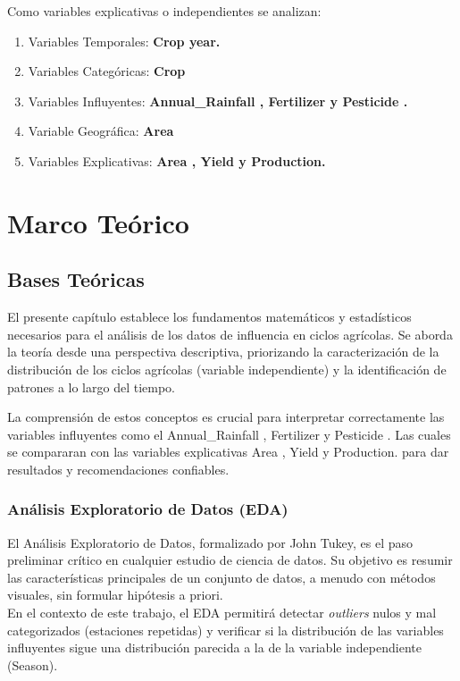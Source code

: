 \documentclass[oneside,11pt]{Latex/Classes/PhDthesisPSnPDF}
\begin{document}
Como variables explicativas o independientes se analizan:

\begin{enumerate}
  \item Variables Temporales: \textbf{Crop year. }
  \item Variables Categóricas: \textbf{Crop}
  \item Variables Influyentes: \textbf{Annual\_Rainfall , Fertilizer y Pesticide . }
    \item Variable Geográfica: \textbf{Area}
        \item Variables Explicativas: \textbf{ Area , Yield y Production.  }

    
\end{enumerate}

\chapter{Marco Teórico}

\section{Bases Teóricas}

El presente capítulo establece los fundamentos matemáticos y
estadísticos necesarios para el análisis de los datos de influencia en
ciclos agrícolas. Se aborda la teoría desde una perspectiva descriptiva,
priorizando la caracterización de la distribución de los ciclos
agrícolas (variable independiente) y la identificación de patrones a lo
largo del tiempo.

La comprensión de estos conceptos es crucial para interpretar
correctamente las variables influyentes como el Annual\_Rainfall ,
Fertilizer y Pesticide . Las cuales se compararan con las variables
explicativas Area , Yield y Production. para dar resultados y
recomendaciones confiables.\\

\subsection{Análisis Exploratorio de Datos (EDA) }

El Análisis Exploratorio de Datos, formalizado por John Tukey, es el
paso preliminar crítico en cualquier estudio de ciencia de datos. Su
objetivo es resumir las características principales de un conjunto de
datos, a menudo con métodos visuales, sin formular hipótesis a priori.\\
En el contexto de este trabajo, el EDA permitirá detectar
\emph{outliers} nulos y mal categorizados (estaciones repetidas) y
verificar si la distribución de las variables influyentes sigue una
distribución parecida a la de la variable independiente (Season).\\
\end{document}
